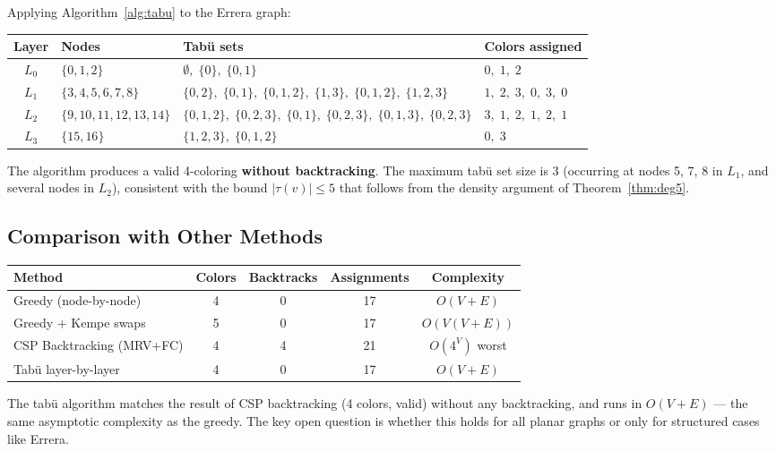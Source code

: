 \documentclass[12pt,letterpaper]{article}
\theoremstyle{plain}
\theoremstyle{definition}
\theoremstyle{remark}
\begin{document}
Applying Algorithm~\ref{alg:tabu} to the Errera graph:

\begin{center}
\begin{tabular}{clll}
\toprule
\textbf{Layer} & \textbf{Nodes} & \textbf{Tab\"{u} sets} & \textbf{Colors assigned} \\
\midrule
$L_0$ & $\{0,1,2\}$
    & $\emptyset,\;\{0\},\;\{0,1\}$
    & $0,\;1,\;2$ \\
$L_1$ & $\{3,4,5,6,7,8\}$
    & $\{0,2\},\;\{0,1\},\;\{0,1,2\},\;\{1,3\},\;\{0,1,2\},\;\{1,2,3\}$
    & $1,\;2,\;3,\;0,\;3,\;0$ \\
$L_2$ & $\{9,10,11,12,13,14\}$
    & $\{0,1,2\},\;\{0,2,3\},\;\{0,1\},\;\{0,2,3\},\;\{0,1,3\},\;\{0,2,3\}$
    & $3,\;1,\;2,\;1,\;2,\;1$ \\
$L_3$ & $\{15,16\}$
    & $\{1,2,3\},\;\{0,1,2\}$
    & $0,\;3$ \\
\bottomrule
\end{tabular}
\end{center}

The algorithm produces a valid 4-coloring \textbf{without backtracking}. The
maximum tab\"{u} set size is 3 (occurring at nodes 5, 7, 8 in $L_1$, and
several nodes in $L_2$), consistent with the bound $|\tau(v)| \leq 5$ that
follows from the density argument of Theorem~\ref{thm:deg5}.

\subsection{Comparison with Other Methods}

\begin{center}
\begin{tabular}{lcccc}
\toprule
\textbf{Method} & \textbf{Colors} & \textbf{Backtracks} & \textbf{Assignments} & \textbf{Complexity} \\
\midrule
Greedy (node-by-node)      & 4 & 0  & 17 & $O(V+E)$ \\
Greedy + Kempe swaps       & 5 & 0  & 17 & $O(V(V+E))$ \\
CSP Backtracking (MRV+FC)  & 4 & 4  & 21 & $O(4^V)$ worst \\
Tab\"{u} layer-by-layer    & 4 & 0  & 17 & $O(V+E)$ \\
\bottomrule
\end{tabular}
\end{center}

The tab\"{u} algorithm matches the result of CSP backtracking (4 colors, valid)
without any backtracking, and runs in $O(V+E)$ — the same asymptotic complexity
as the greedy. The key open question is whether this holds for all planar graphs
or only for structured cases like Errera.
\end{document}
